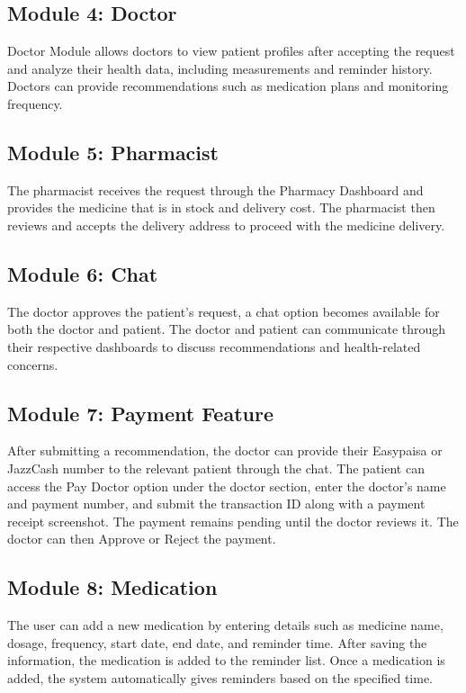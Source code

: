 \subsection{Module 4: Doctor}
Doctor Module allows doctors to view patient profiles after accepting the request and analyze their health data, including measurements and reminder history. Doctors can provide recommendations such as medication plans and monitoring frequency.

\subsection{Module 5: Pharmacist}
The pharmacist receives the request through the Pharmacy Dashboard and provides the medicine that is in stock and delivery cost. The pharmacist then reviews and accepts the delivery address to proceed with the medicine delivery.

\subsection{Module 6: Chat}
The doctor approves the patient's request, a chat option becomes available for both the doctor and patient. The doctor and patient can communicate through their respective dashboards to discuss recommendations and health-related concerns.

\subsection{Module 7: Payment Feature}
After submitting a recommendation, the doctor can provide their Easypaisa or JazzCash number to the relevant patient through the chat. The patient can access the Pay Doctor option under the doctor section, enter the doctor's name and payment number, and submit the transaction ID along with a payment receipt screenshot. The payment remains pending until the doctor reviews it. The doctor can then Approve or Reject the payment.

\subsection{Module 8: Medication}
The user can add a new medication by entering details such as medicine name, dosage, frequency, start date, end date, and reminder time. After saving the information, the medication is added to the reminder list. Once a medication is added, the system automatically gives reminders based on the specified time.

